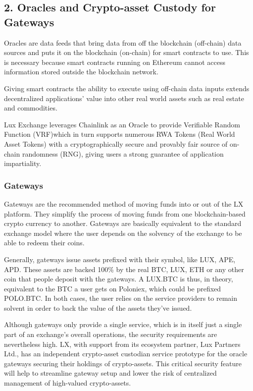 \documentclass[11pt]{article}
\begin{document}
\subsection{2. Oracles  and Crypto-asset Custody for Gateways}

Oracles are data feeds that bring data from off the blockchain (off-chain) data sources and puts it on the blockchain (on-chain) for smart contracts to use. This is necessary because smart contracts running on Ethereum cannot access information stored outside the blockchain network.


Giving smart contracts the ability to execute using off-chain data inputs extends decentralized applications' value into other real world assets such as real estate and commodities.


Lux Exchange leverages Chainlink as an Oracle to provide Verifiable Random Function (VRF)which in turn supports numerous RWA Tokens (Real World Asset Tokens) with a cryptographically secure and provably fair source of on-chain randomness (RNG), giving users a strong guarantee of application impartiality.


\subsubsection{Gateways}

Gateways are the recommended method of moving funds into or out of the LX platform. They simplify the process of moving funds from one blockchain-based crypto currency to another. Gateways are basically equivalent to the standard exchange model where the user depends on the solvency of the exchange to be able to redeem their coins.


Generally, gateways issue assets prefixed with their symbol, like LUX, APE, APD. These assets are backed 100\% by the real BTC, LUX, ETH or any other coin that people deposit with the gateways. A LUX.BTC is thus, in theory, equivalent to the BTC a user gets on Poloniex, which could be prefixed POLO.BTC. In both cases, the user relies on the service providers to remain solvent in order to back the value of the assets they've issued.


Although gateways only provide a single service, which is in itself just a single part of an exchange's overall operations, the security requirements are nevertheless high. LX, with support from its ecosystem partner, Lux Partners Ltd., has an independent crypto-asset custodian service prototype for the oracle gateways securing their holdings of crypto-assets. This critical security feature will help to streamline gateway setup and lower the risk of centralized management of high-valued crypto-assets.
\end{document}
